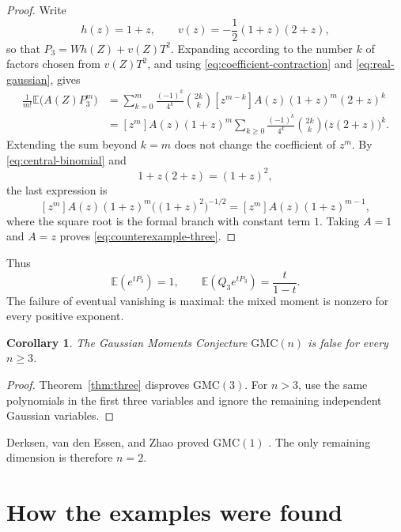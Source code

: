 \documentclass[11pt]{article}
\newcommand{\E}{\mathbb E}
\newcommand{\GMC}{\mathrm{GMC}}
\newtheorem{corollary}[theorem]{Corollary}
\theoremstyle{remark}
\begin{document}
\begin{proof}
Write
\[
  h(z)=1+z,
  \qquad
  v(z)=-\frac12(1+z)(2+z),
\]
so that $P_3=Wh(Z)+v(Z)T^2$.  Expanding according to the number $k$ of factors chosen from $v(Z)T^2$, and using \eqref{eq:coefficient-contraction} and \eqref{eq:real-gaussian}, gives
\begin{align*}
\frac1{m!}\E\bigl(A(Z)P_3^m\bigr)
 &=\sum_{k=0}^m
   \frac{(-1)^k}{4^k}\binom{2k}{k}
   [z^{m-k}]A(z)(1+z)^m(2+z)^k\\
 &= [z^m]A(z)(1+z)^m
    \sum_{k\geq0}\frac{(-1)^k}{4^k}\binom{2k}{k}
      \bigl(z(2+z)\bigr)^k.
\end{align*}
Extending the sum beyond $k=m$ does not change the coefficient of $z^m$.  By \eqref{eq:central-binomial} and
\[
  1+z(2+z)=(1+z)^2,
\]
the last expression is
\[
  [z^m]A(z)(1+z)^m\bigl((1+z)^2\bigr)^{-1/2}
  =[z^m]A(z)(1+z)^{m-1},
\]
where the square root is the formal branch with constant term $1$.  Taking $A=1$ and $A=z$ proves \eqref{eq:counterexample-three}.
\end{proof}

Thus
\begin{equation}\label{eq:egf-three}
  \E(e^{tP_3})=1,
  \qquad
  \E(Q_3e^{tP_3})=\frac{t}{1-t}.
\end{equation}
The failure of eventual vanishing is maximal: the mixed moment is nonzero for every positive exponent.

\begin{corollary}\label{cor:dimensions}
The Gaussian Moments Conjecture $\GMC(n)$ is false for every $n\geq3$.
\end{corollary}

\begin{proof}
Theorem~\ref{thm:three} disproves $\GMC(3)$.  For $n>3$, use the same polynomials in the first three variables and ignore the remaining independent Gaussian variables.
\end{proof}

Derksen, van den Essen, and Zhao proved $\GMC(1)$ \cite[Proposition~4.2]{DVEZ}.  The only remaining dimension is therefore $n=2$.

\section{How the examples were found}
\end{document}
